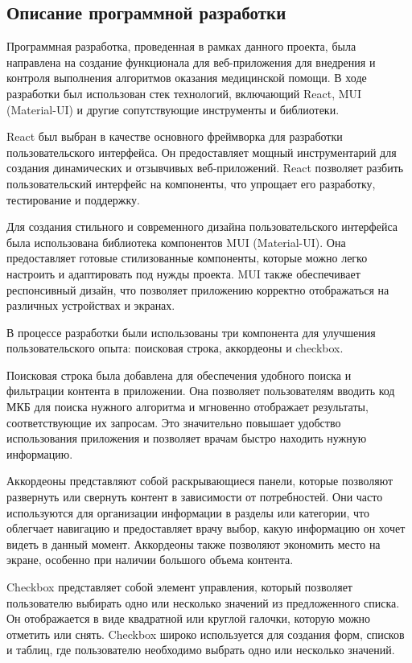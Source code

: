 \subsection{Описание программной разработки}

Программная разработка, проведенная в рамках данного проекта, была направлена на создание функционала для веб-приложения для внедрения и контроля выполнения алгоритмов оказания медицинской помощи. В ходе разработки был использован стек технологий, включающий React, MUI (Material-UI) и другие сопутствующие инструменты и библиотеки.

React был выбран в качестве основного фреймворка для разработки пользовательского интерфейса. Он предоставляет мощный инструментарий для создания динамических и отзывчивых веб-приложений. React позволяет разбить пользовательский интерфейс на компоненты, что упрощает его разработку, тестирование и поддержку.

Для создания стильного и современного дизайна пользовательского интерфейса была использована библиотека компонентов MUI (Material-UI). Она предоставляет готовые стилизованные компоненты, которые можно легко настроить и адаптировать под нужды проекта. MUI также обеспечивает респонсивный дизайн, что позволяет приложению корректно отображаться на различных устройствах и экранах.

В процессе разработки были использованы три компонента для улучшения пользовательского опыта: поисковая строка, аккордеоны \cite{MUI1} и checkbox.

Поисковая строка была добавлена для обеспечения удобного поиска и фильтрации контента в приложении. Она позволяет пользователям вводить код МКБ для поиска нужного алгоритма и мгновенно отображает результаты, соответствующие их запросам. Это значительно повышает удобство использования приложения и позволяет врачам быстро находить нужную информацию.

Аккордеоны представляют собой раскрывающиеся панели, которые позволяют развернуть или свернуть контент в зависимости от потребностей. Они часто используются для организации информации в разделы или категории, что облегчает навигацию и предоставляет врачу выбор, какую информацию он хочет видеть в данный момент. Аккордеоны также позволяют экономить место на экране, особенно при наличии большого объема контента.

Checkbox представляет собой элемент управления, который позволяет пользователю выбирать одно или несколько значений из предложенного списка. Он отображается в виде квадратной или круглой галочки, которую можно отметить или снять. Checkbox широко используется для создания форм, списков и таблиц, где пользователю необходимо выбрать одно или несколько значений.

